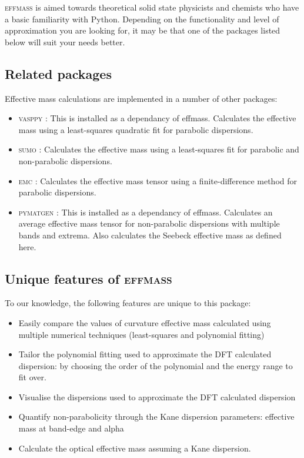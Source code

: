 \textsc{effmass} is aimed towards theoretical solid state physicists and chemists who have a basic familiarity with Python. Depending on the functionality and level of approximation you are looking for, it may be that one of the packages listed below will suit your needs better.

\subsection*{Related packages}
\label{sec:related}

Effective mass calculations are implemented in a number of other packages:
\begin{itemize}
    \item \textsc{vasppy} \cite{Morgan2018}: This is installed as a dependancy of effmass. Calculates the effective mass using a least-squares quadratic fit for parabolic dispersions.
    \item \textsc{sumo} \cite{Ganose2018}: Calculates the effective mass using a least-squares fit for parabolic and non-parabolic dispersions.
    \item \textsc{emc} \cite{Fornari2012}: Calculates the effective mass tensor using a finite-difference method for parabolic dispersions.
    \item \textsc{pymatgen} \cite{Ong2013}: This is installed as a dependancy of effmass. Calculates an average effective mass tensor for non-parabolic dispersions with multiple bands and extrema. Also calculates the Seebeck effective mass as defined here.
\end{itemize}

\subsection*{Unique features of \textsc{effmass}}
\label{sec:unique}

To our knowledge, the following features are unique to this package:
\begin{itemize}
    \item Easily compare the values of curvature effective mass calculated using multiple numerical techniques (least-squares and polynomial fitting)
    \item Tailor the polynomial fitting used to approximate the DFT calculated dispersion: by choosing the order of the polynomial and the energy range to fit over.
    \item Visualise the dispersions used to approximate the DFT calculated dispersion
    \item Quantify non-parabolicity through the Kane dispersion parameters: effective mass at band-edge and alpha
    \item Calculate the optical effective mass assuming a Kane dispersion.
\end{itemize}

